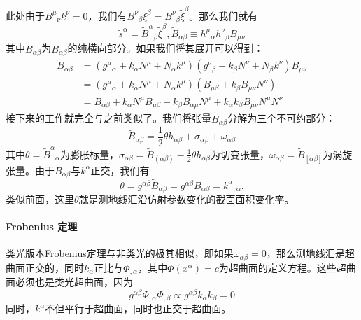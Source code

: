 \documentclass[hyperref, UTF8, a4paper]{ctexart}
\begin{document}
此处由于$B^{\mu }{}_{\nu } k^{\nu } =0$，我们有$B^{\nu }{}_{\beta } \xi ^{\beta } =B^{\nu }{}_{\beta }\tilde{\xi }^{\beta }$。那么我们就有
\begin{equation*}
	\tilde{s}^{\alpha } =\tilde{B}^{\alpha }{}_{\beta }\tilde{\xi }^{\beta } ,\tilde{B}_{\alpha \beta } \equiv h^{\mu }{}_{\alpha } h^{\nu }{}_{\beta } B_{\mu \nu }
\end{equation*}
其中$\tilde{B}_{\alpha \beta }$为$B_{\alpha \beta }$的纯横向部分。如果我们将其展开可以得到：
\begin{equation*}
	\begin{aligned}
		\tilde{B}_{\alpha \beta } & =(g^{\mu }{}_{\alpha } +k_{\alpha } N^{\mu } +N_{\alpha } k^{\mu } )(g^{\nu }{}_{\beta } +k_{\beta } N^{\nu } +N_{\beta } k^{\nu } )B_{\mu \nu }\\
		& =(g^{\mu }{}_{\alpha } +k_{\alpha } N^{\mu } +N_{\alpha } k^{\mu } )(B_{\mu \beta } +k_{\beta } B_{\mu \nu } N^{\nu } )\\
		& =B_{\alpha \beta } +k_{\alpha } N^{\mu } B_{\mu \beta } +k_{\beta } B_{\alpha \mu } N^{\mu } +k_{\alpha } k_{\beta } B_{\mu \nu } N^{\mu } N^{\nu }
	\end{aligned}
\end{equation*}
接下来的工作就完全与之前类似了。我们将张量$\tilde{B}_{\alpha \beta }$分解为三个不可约部分：
\begin{equation*}
	\tilde{B}_{\alpha \beta } =\frac{1}{2} \theta h_{\alpha \beta } +\sigma _{\alpha \beta } +\omega _{\alpha \beta }
\end{equation*}
其中$\theta =\tilde{B}^{\alpha }{}_{\alpha }$为膨胀标量，$\sigma _{\alpha \beta } =\tilde{B}_{( \alpha \beta )} -\frac{1}{2} \theta h_{\alpha \beta }$为切变张量，$\omega _{\alpha \beta } =\tilde{B}_{[ \alpha \beta ]}$为涡旋张量。由于$B_{\alpha \beta }$与$k^{\alpha }$正交，我们有
\begin{equation*}
	\theta =g^{\alpha \beta }\tilde{B}_{\alpha \beta } =g^{\alpha \beta } B_{\alpha \beta } =k^{\alpha }{}_{;\alpha } .
\end{equation*}
类似前面，这里$\theta $就是测地线汇沿仿射参数变化的截面面积变化率。


\paragraph{Frobenius 定理}

类光版本Frobenius定理与非类光的极其相似，即如果$\omega _{\alpha \beta } =0$，那么测地线汇是超曲面正交的，同时$k_{\alpha }$正比与$\Phi _{,\alpha }$，其中$\Phi (x^{\alpha } )=c$为超曲面的定义方程。这些超曲面必须也是类光超曲面，因为
\begin{equation*}
	g^{\alpha \beta } \Phi _{,\alpha } \Phi _{,\beta } \varpropto g^{\alpha \beta } k_{\alpha } k_{\beta } =0
\end{equation*}
同时，$k^{\alpha }$不但平行于超曲面，同时也正交于超曲面。
\end{document}

